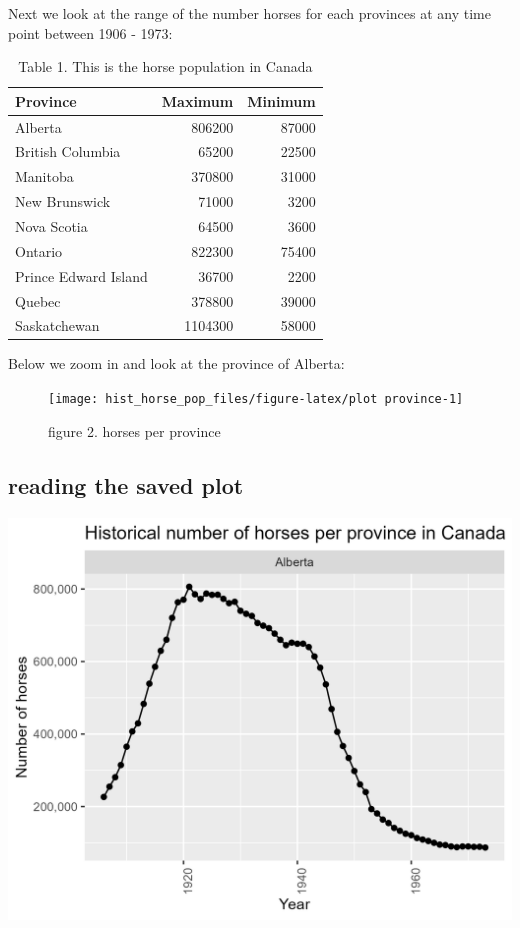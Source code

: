 \documentclass[
]{article}
\begin{document}
Next we look at the range of the number horses for each provinces at any
time point between 1906 - 1973:

\begin{table}

\caption{\label{tab:max horse table}Table 1. This is the horse population in Canada}
\centering
\begin{tabular}[t]{l|r|r}
\hline
Province & Maximum & Minimum\\
\hline
Alberta & 806200 & 87000\\
\hline
British Columbia & 65200 & 22500\\
\hline
Manitoba & 370800 & 31000\\
\hline
New Brunswick & 71000 & 3200\\
\hline
Nova Scotia & 64500 & 3600\\
\hline
Ontario & 822300 & 75400\\
\hline
Prince Edward Island & 36700 & 2200\\
\hline
Quebec & 378800 & 39000\\
\hline
Saskatchewan & 1104300 & 58000\\
\hline
\end{tabular}
\end{table}

Below we zoom in and look at the province of Alberta:

\begin{figure}

{\centering \texttt{[image: hist\_horse\_pop\_files/figure-latex/plot province-1]} 

}

\caption{figure 2. horses per province}\label{fig:plot province}
\end{figure}

\hypertarget{reading-the-saved-plot}{%
\subsection{reading the saved plot}\label{reading-the-saved-plot}}

\begin{center}\includegraphics[width=0.4\linewidth,height=0.4\textheight]{province_plot} \end{center}
\end{document}
